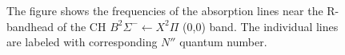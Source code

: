 \begin{figure}

\centering



\caption[CH \(B^2\Sigma^-\leftarrow X^2\Pi\) (0,0) R-bandhead absorption lines]{The figure shows the frequencies of the absorption lines near the R-bandhead of the CH \(B^2\Sigma^-\leftarrow X^2\Pi\) (0,0) band. The individual lines are labeled with corresponding \(N''\) quantum number.}

\label{fig:chB-XAbsorption}

\end{figure}

